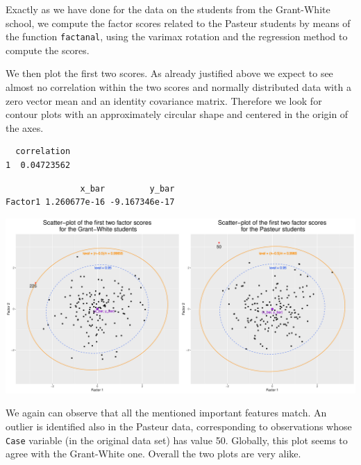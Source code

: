 \documentclass[
  letterpaper,
  DIV=11,
  numbers=noendperiod]{scrartcl}
\newenvironment{Shaded}{\begin{snugshade}}{\end{snugshade}}
\newcommand{\AttributeTok}[1]{\textcolor[rgb]{0.40,0.45,0.13}{#1}}
\newcommand{\DecValTok}[1]{\textcolor[rgb]{0.68,0.00,0.00}{#1}}
\newcommand{\FloatTok}[1]{\textcolor[rgb]{0.68,0.00,0.00}{#1}}
\newcommand{\FunctionTok}[1]{\textcolor[rgb]{0.28,0.35,0.67}{#1}}
\newcommand{\NormalTok}[1]{\textcolor[rgb]{0.00,0.23,0.31}{#1}}
\newcommand{\OtherTok}[1]{\textcolor[rgb]{0.00,0.23,0.31}{#1}}
\newcommand{\SpecialCharTok}[1]{\textcolor[rgb]{0.37,0.37,0.37}{#1}}
\newcommand{\StringTok}[1]{\textcolor[rgb]{0.13,0.47,0.30}{#1}}
\begin{document}
Exactly as we have done for the data on the students from the
Grant-White school, we compute the factor scores related to the Pasteur
students by means of the function \texttt{factanal}, using the varimax
rotation and the regression method to compute the scores.

\begin{Shaded}
\end{Shaded}

We then plot the first two scores. As already justified above we expect
to see almost no correlation within the two scores and normally
distributed data with a zero vector mean and an identity covariance
matrix. Therefore we look for contour plots with an approximately
circular shape and centered in the origin of the axes.

\begin{verbatim}
  correlation
1  0.04723562
\end{verbatim}

\begin{verbatim}
               x_bar         y_bar
Factor1 1.260677e-16 -9.167346e-17
\end{verbatim}

\includegraphics{ProblemSet2_files/figure-pdf/unnamed-chunk-57-1.pdf}

We again can observe that all the mentioned important features match. An
outlier is identified also in the Pasteur data, corresponding to
observations whose \texttt{Case} variable (in the original data set) has
value 50. Globally, this plot seems to agree with the Grant-White one.
Overall the two plots are very alike.
\end{document}
